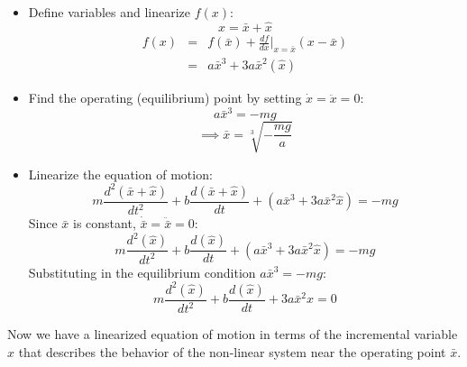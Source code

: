 ﻿\documentclass[12pt]{article}
\begin{document}
\begin{itemize}
    \item[I.] Define variables and linearize $f(x)$:
    \[x = \bar{x} + \hat{x}\]
    \begin{eqnarray*}
    f(x) &=&  f(\bar{x}) + \frac{df}{dx}\bigg|_{x=\bar{x}} (x-\bar{x})\\
    &=& a\bar{x}^3 + 3a\bar{x}^2(\hat{x})
    \end{eqnarray*}
    \item[II.] Find the operating (equilibrium) point by setting $\dot{x} = \ddot{x} = 0$:
\[a\bar{x}^3 = -mg\]
\[\implies \bar{x} = \sqrt[3]{-\frac{mg}{a}}\]
    \item[III.] Linearize the equation of motion:
    \[m\frac{d^2 (\bar{x}+\hat{x})}{dt^2} + b\frac{d(\bar{x}+\hat{x})}{dt} + (a\bar{x}^3 + 3a\bar{x}^2\hat{x}) = -mg\]
    Since $\bar{x}$ is constant, $\dot{\bar{x}} = \ddot{\bar{x}} = 0$:
    \[m\frac{d^2(\hat{x})}{dt^2} + b\frac{d(\hat{x})}{dt} + (a\bar{x}^3 + 3a\bar{x}^2\hat{x}) = -mg\]
    Substituting in the equilibrium condition $a\bar{x}^3 = -mg$:
    \[m\frac{d^2(\hat{x})}{dt^2} + b\frac{d(\hat{x})}{dt} + 3a\bar{x}^2\hat{x} = 0\]
\end{itemize}
Now we have a linearized equation of motion in terms of the incremental variable $\hat{x}$ that describes the behavior of the non-linear system near the operating point $\bar{x}$.
\end{document}
